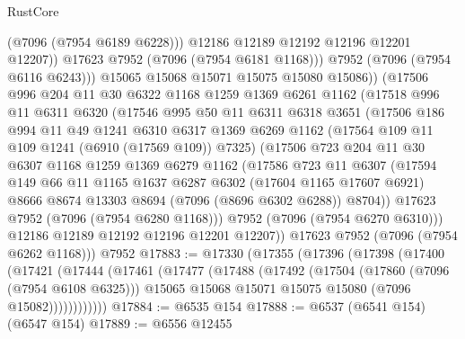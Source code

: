 \begin{lexlean}{RustCore}
\begin{coremodule}
                  (@7096 (@7954 @6189 @6228)))
                @12186
                @12189
                @12192
                @12196
                @12201
                @12207))
            @17623
            @7952
            (@7096 (@7954 @6181 @1168)))
          @7952
          (@7096 (@7954 @6116 @6243)))
        @15065
        @15068
        @15071
        @15075
        @15080
        @15086))
    (@17506
      @996
      @204
      @11
      @30
      @6322
      @1168
      @1259
      @1369
      @6261
      @1162
      (@17518
        @996
        @11
        @6311
        @6320
        (@17546
          @995
          @50
          @11
          @6311
          @6318
          @3651
          (@17506
            @186
            @994
            @11
            @49
            @1241
            @6310
            @6317
            @1369
            @6269
            @1162
            (@17564 @109 @11 @109 @1241 (@6910 (@17569 @109)) @7325)
            (@17506
              @723
              @204
              @11
              @30
              @6307
              @1168
              @1259
              @1369
              @6279
              @1162
              (@17586
                @723
                @11
                @6307
                (@17594
                  @149
                  @66
                  @11
                  @1165
                  @1637
                  @6287
                  @6302
                  (@17604 @1165 @17607 @6921)
                  @8666
                  @8674
                  @13303
                  @8694
                  (@7096 (@8696 @6302 @6288))
                  @8704))
              @17623
              @7952
              (@7096 (@7954 @6280 @1168)))
            @7952
            (@7096 (@7954 @6270 @6310)))
          @12186
          @12189
          @12192
          @12196
          @12201
          @12207))
      @17623
      @7952
      (@7096 (@7954 @6262 @1168)))
    @7952
@17883 := @17330
    (@17355
      (@17396
        (@17398
          (@17400
            (@17421
              (@17444
                (@17461
                  (@17477
                    (@17488
                      (@17492
                        (@17504
                          (@17860 (@7096 (@7954 @6108 @6325)))
                          @15065
                          @15068
                          @15071
                          @15075
                          @15080
                          (@7096 @15082))))))))))))
@17884 := @6535 @154
@17888 := @6537 (@6541 @154) (@6547 @154)
@17889 := @6556 @12455

\end{coremodule}
\end{lexlean}
